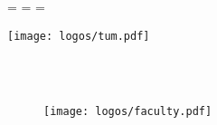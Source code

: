 \begin{titlepage}
  \oddsidemargin=\evensidemargin\relax
  \textwidth=\dimexpr{}\evensidemargin-2in\relax
  \hsize=\textwidth\relax

  
  \centering
  \vspace{40mm}
  \texttt{[image: logos/tum.pdf]}
  

  \vspace{5mm}
  {\huge\MakeUppercase{\getFaculty{}}}\\

  \vspace{5mm}
  {\large\MakeUppercase{\getUniversity{}}}\\

  \vspace{20mm}
  {\Large \getDoctype{}}
	
	\vspace{15mm}
  {\huge\bfseries \getTitle{}}

  \vspace{15mm}
  {\LARGE \getAuthor{}}

	\begin{figure}[h!]
	\centering
	\texttt{[image: logos/faculty.pdf]}
	\end{figure} 
\end{titlepage}
